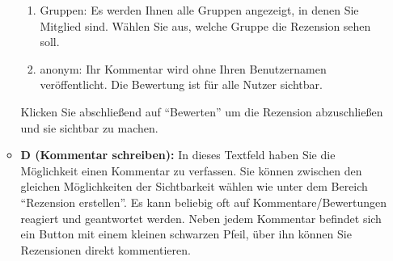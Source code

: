 \begin{enumerate}
\begin{itemize}
\begin{enumerate}
            \item Gruppen: Es werden Ihnen alle Gruppen angezeigt, in denen Sie Mitglied sind. Wählen Sie aus, welche Gruppe die Rezension sehen soll.
            \item anonym: Ihr Kommentar wird ohne Ihren Benutzernamen veröffentlicht. Die Bewertung ist für alle Nutzer sichtbar.
        \end{enumerate}
       	Klicken Sie abschließend auf \enquote{Bewerten} um die Rezension abzuschließen und sie sichtbar zu machen.
        \item \textbf{D (Kommentar schreiben):} In dieses Textfeld haben Sie die Möglichkeit einen Kommentar zu verfassen. Sie können zwischen den gleichen Möglichkeiten der Sichtbarkeit wählen wie unter dem Bereich \enquote{Rezension erstellen}.
\newline Es kann beliebig oft auf Kommentare/Bewertungen reagiert und geantwortet werden. Neben jedem Kommentar befindet sich ein Button mit einem kleinen schwarzen Pfeil, über ihn können Sie Rezensionen direkt kommentieren. 
    \end{itemize}
\end{enumerate}